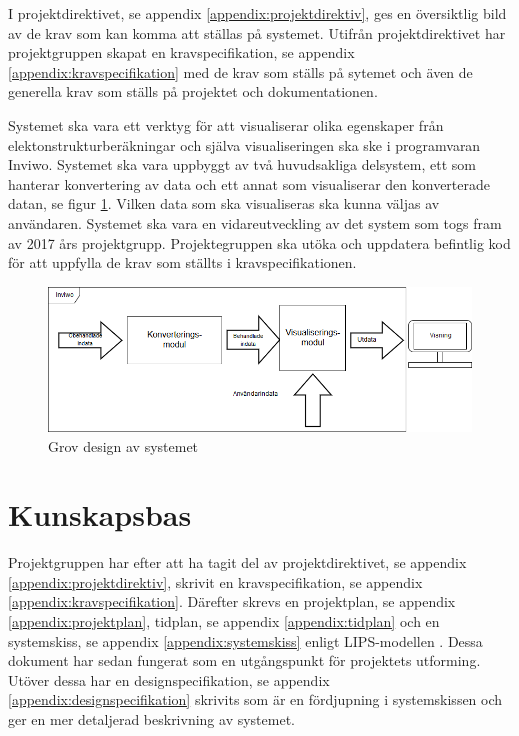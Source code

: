 \documentclass[a4paper,12pt]{article}
\begin{document}
I projektdirektivet, se appendix \ref{appendix:projektdirektiv}, ges en översiktlig bild av de krav som kan komma att ställas på systemet. Utifrån projektdirektivet har projektgruppen skapat en kravspecifikation, se appendix \ref{appendix:kravspecifikation} med de krav som ställs på sytemet och även de generella krav som ställs på projektet och dokumentationen.

Systemet ska vara ett verktyg för att visualiserar olika egenskaper från elektonstrukturberäkningar och själva visualiseringen ska ske i programvaran Inviwo\cite{Inviwo}.
Systemet ska vara uppbyggt av två huvudsakliga delsystem, ett som hanterar konvertering av data och ett annat som visualiserar den konverterade datan, se figur \ref{fig:grov-skiss}. Vilken data som ska visualiseras ska kunna väljas av användaren. Systemet ska vara en vidareutveckling av det system som togs fram av 2017 års projektgrupp. Projektegruppen ska utöka och uppdatera befintlig kod för att uppfylla de krav som ställts i kravspecifikationen.

\begin{figure}[H]
	\centering
	\includegraphics[scale=0.55]{grov-skiss.png}
	\caption{Grov design av systemet}
	\label{fig:grov-skiss}
\end{figure}



\section{Kunskapsbas}
\label{ch:kunskapsbas}
Projektgruppen har efter att ha tagit del av projektdirektivet, se appendix \ref{appendix:projektdirektiv},
skrivit en kravspecifikation, se appendix \ref{appendix:kravspecifikation}. Därefter skrevs en projektplan, se appendix \ref{appendix:projektplan}, tidplan, se appendix \ref{appendix:tidplan} och en  systemskiss, se appendix \ref{appendix:systemskiss} enligt LIPS-modellen \cite{LIPS}. 
Dessa dokument har sedan fungerat som en utgångspunkt för projektets utforming. Utöver dessa har en designspecifikation, se appendix \ref{appendix:designspecifikation} skrivits som är en fördjupning i systemskissen och ger en mer detaljerad beskrivning av systemet.
\end{document}
